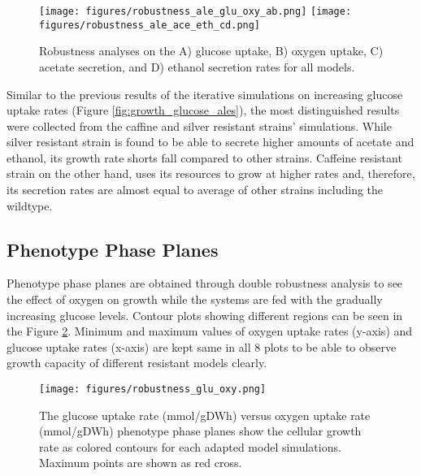 \begin{figure}[H]
  \begin{center}
  \texttt{[image: figures/robustness\_ale\_glu\_oxy\_ab.png]}
  \texttt{[image: figures/robustness\_ale\_ace\_eth\_cd.png]}
  \caption[Robustness analyses on the A) glucose uptake, B) oxygen uptake, C) acetate secretion, and D) ethanol secretion rates for all models.]{Robustness analyses on the A) glucose uptake, B) oxygen uptake, C) acetate secretion, and D) ethanol secretion rates for all models.}
  \label{fig:robustness_ale}
  \end{center}
  \end{figure}
\vspace{-2.0cm}

Similar to the previous results of the iterative simulations on increasing glucose uptake rates (Figure \ref{fig:growth_glucose_ales}), the most distinguished results were collected from the caffine and silver resistant strains' simulations. While silver resistant strain is found to be able to secrete higher amounts of acetate and ethanol, its growth rate shorts fall compared to other strains. Caffeine resistant strain on the other hand, uses its resources to grow at higher rates and, therefore, its secretion rates are almost equal to average of other strains including the wildtype.

\subsection{Phenotype Phase Planes}

Phenotype phase planes are obtained through double robustness analysis to see the effect of oxygen on growth while the systems are fed with the gradually increasing glucose levels. Contour plots showing different regions can be seen in the Figure \ref{fig:robustness_glu_oxy}. Minimum and maximum values of oxygen uptake rates (y-axis) and glucose uptake rates (x-axis) are kept same in all 8 plots to be able to observe growth capacity of different resistant models clearly.

\begin{figure}
  \begin{center}
  \texttt{[image: figures/robustness\_glu\_oxy.png]}
  \caption[The glucose uptake rate (mmol/gDWh) versus oxygen uptake rate (mmol/gDWh) phenotype phase planes show the cellular growth rate as colored contours for each adapted model simulations]{The glucose uptake rate (mmol/gDWh) versus oxygen uptake rate (mmol/gDWh) phenotype phase planes show the cellular growth rate as colored contours for each adapted model simulations. Maximum points are shown as red cross.}
  \label{fig:robustness_glu_oxy}
  \end{center}
  \end{figure}


